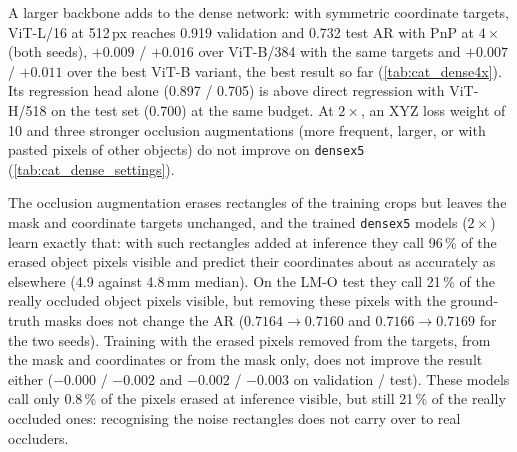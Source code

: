 A larger backbone adds to the dense network: with symmetric coordinate targets, ViT-L/16 at 512\,px
reaches 0.919 validation and 0.732 test AR with PnP at $4\times$ (both seeds), $+0.009$ / $+0.016$ over
ViT-B/384 with the same targets and $+0.007$ / $+0.011$ over the best ViT-B variant, the best result so
far (\cref{tab:cat_dense4x}). Its regression head alone (0.897 / 0.705) is above direct regression with
ViT-H/518 on the test set (0.700) at the same budget. At $2\times$, an XYZ loss weight of 10 and three
stronger occlusion augmentations (more frequent, larger, or with pasted pixels of other objects) do
not improve on \texttt{densex5} (\cref{tab:cat_dense_settings}).

The occlusion augmentation erases rectangles of the training crops but leaves the mask and coordinate
targets unchanged, and the trained \texttt{densex5} models ($2\times$) learn exactly that: with such
rectangles added at inference they call 96\,\% of the erased object pixels visible and predict their
coordinates about as accurately as elsewhere (4.9 against 4.8\,mm median). On the LM-O test they call
21\,\% of the really occluded object pixels visible, but removing these pixels with the ground-truth
masks does not change the AR ($0.7164 \to 0.7160$ and $0.7166 \to 0.7169$ for the two seeds).
Training with the erased pixels removed from the targets, from the mask and coordinates or from the
mask only, does not improve the result either ($-0.000$ / $-0.002$ and $-0.002$ / $-0.003$ on
validation / test). These models call only 0.8\,\% of the pixels erased at inference visible, but still
21\,\% of the really occluded ones: recognising the noise rectangles does not carry over to real
occluders.

